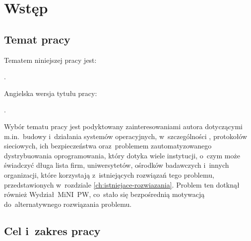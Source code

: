 \documentclass[thesis]{subfiles}
\makeatletter
\let\inserttitle\@title
\let\inserttitleaux\@titleaux
\makeatother
\begin{document}
\chapter{Wstęp}


\section{Temat pracy}

\noindent Tematem niniejszej pracy jest:\mynobreakpar
\begin{displayquote}
\inserttitle.
\end{displayquote}
Angielska wersja tytułu pracy:\mynobreakpar
\begin{displayquote}
\inserttitleaux.
\end{displayquote}
Wybór tematu pracy jest podyktowany zainteresowaniami autora dotyczącymi m.in.~budowy i~działania systemów operacyjnych, w~szczególności , protokołów sieciowych, ich bezpieczeństwa oraz~problemem zautomatyzowanego dystrybuowania oprogramowania, który dotyka wiele instytucji, o~czym może świadczyć długa lista firm, uniwersytetów, ośrodków badawczych i~innych organizacji, które korzystają z~istniejących rozwiązań tego problemu, przedstawionych w~rozdziale \ref{ch:istniejace-rozwiazania}. Problem ten dotknął również Wydział~MiNI~PW, co~stało się bezpośrednią motywacją do~alternatywnego rozwiązania problemu.


\section{Cel i~zakres pracy}
\label{sec:cel-i-zakres}
\end{document}
